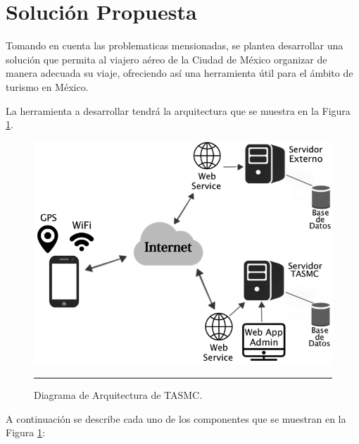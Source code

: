 \section{Solución Propuesta}

Tomando en cuenta las problematicas mensionadas, se plantea desarrollar una solución que permita al viajero aéreo de la Ciudad de México organizar de manera adecuada su viaje, ofreciendo así una herramienta útil para el ámbito de turismo en México.

La herramienta a desarrollar tendrá la arquitectura que se muestra en la Figura \ref{fig:Arquitectura}. 

\begin{figure}[htbp]
	\centering
		\includegraphics{Figuras/arquitectura.png}
		\rule{35em}{0.5pt}
	\caption[Diagrama de Arquitectura de TASMC]{Diagrama de Arquitectura de TASMC.}
	\label{fig:Arquitectura}
\end{figure}

A continuación se describe cada uno de los componentes que se muestran en la Figura \ref{fig:Arquitectura}:

